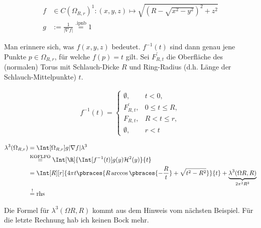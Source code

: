 \begin{solution}
\begin{enumerate}[label = \arabic*.]
    \begin{align*}
        f & \in C(\Omega_{R, r})^1: (x, y, z) \mapsto \sqrt{(R - \sqrt{x^2 - y^2})^2 + z^2} \\
        g
        & :=
        \frac{1}{|\nabla f|}
        \stackrel
        {
            \text{.ipnb}
        }{=}
        1
    \end{align*}

    Man erinnere sich, was $f(x, y, z)$ bedeutet.
    $f^{-1}(t)$ sind dann genau jene Punkte $p \in \Omega_{R, r}$, für welche $f(p) = t$ gilt.
    Sei $F^\prime_{R, t}$ die Oberfläche des (normalen) Torus mit Schlauch-Dicke $R$ und Ring-Radius (d.h. Länge der Schlauch-Mittelpunkte) $t$.


    \begin{align*}
        f^{-1}(t)
        =
        \begin{cases}
            \emptyset,       & t < 0,           \\
            F^\prime_{R, t}, & 0 \leq t \leq R, \\
            F_{R, t},        & R < t \leq r,    \\
            \emptyset,       & r < t
        \end{cases}
    \end{align*}


    \begin{align*}
        \lambda^3(\Omega_{R, r})
        & =
        \Int[\Omega_{R, r}]
        {
            g |\nabla f|
        }{\lambda^3} \\
        & \stackrel
        {
            \text{KOFLFO}
        }{=}
        \Int[\R]
        {
            \Int[f^{-1}(t)]
            {
                g(y)
            }{\mathcal{H}^2(y)}
        }{t} \\
        & =
        \Int[R][r]
        {
            4 \pi t
            \pbraces
            {
                R \arccos \pbraces{-\frac{R}{t}}
                +
                \sqrt{t^2 - R^2}
            }
        }{t}
        +
        \underbrace
        {
            \lambda^3(\Omega{R, R})
        }_{
            2 \pi^2 R^3
        } \\
        & \stackrel{!}{=}
        \mathrm{rhs}
    \end{align*}

    Die Formel für $\lambda^3(\Omega{R, R})$ kommt aus dem Hinweis vom nächsten Beispiel.
    Für die letzte Rechnung hab ich keinen Bock mehr.

\end{enumerate}

\end{solution}

